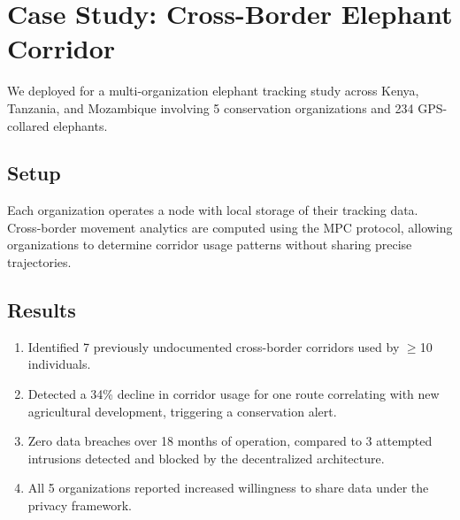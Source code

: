 \section{Case Study: Cross-Border Elephant Corridor}


We deployed \WildTrack{} for a multi-organization elephant tracking study across Kenya, Tanzania, and Mozambique involving 5 conservation organizations and 234 GPS-collared elephants.

\subsection{Setup}

Each organization operates a \WildTrack{} node with local storage of their tracking data. Cross-border movement analytics are computed using the MPC protocol, allowing organizations to determine corridor usage patterns without sharing precise trajectories.

\subsection{Results}

\begin{enumerate}[leftmargin=*]
    \item Identified 7 previously undocumented cross-border corridors used by $\geq$10 individuals.
    \item Detected a 34\% decline in corridor usage for one route correlating with new agricultural development, triggering a conservation alert.
    \item Zero data breaches over 18 months of operation, compared to 3 attempted intrusions detected and blocked by the decentralized architecture.
    \item All 5 organizations reported increased willingness to share data under the \WildTrack{} privacy framework.
\end{enumerate}

